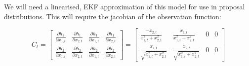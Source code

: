 We will need a linearised, EKF approximation of this model for use in proposal distributions. This will require the jacobian of the observation function:

\begin{equation}
C_t = \begin{bmatrix} \frac{\partial h_1}{\partial x_{1,t}} & \frac{\partial h_1}{\partial x_{2,t}} & \frac{\partial h_1}{\partial \dot{x}_{1,t}} & \frac{\partial h_1}{\partial \dot{x}_{2,t}} \\ \frac{\partial h_2}{\partial x_{1,t}} & \frac{\partial h_2}{\partial x_{2,t}} & \frac{\partial h_2}{\partial \dot{x}_{1,t}} & \frac{\partial h_2}{\partial \dot{x}_{2,t}} \end{bmatrix}
= \begin{bmatrix} \frac{-x_{2,t}}{x_{1,t}^2 + x_{2,t}^2} & \frac{x_{1,t}}{x_{1,t}^2 + x_{2,t}^2} & 0 & 0 \\ \frac{x_{1,t}}{\sqrt{x_{1,t}^2 + x_{2,t}^2}} & \frac{x_{2,t}}{\sqrt{x_{1,t}^2 + x_{2,t}^2}} & 0 & 0 \end{bmatrix}
\label{eq:}
\end{equation}